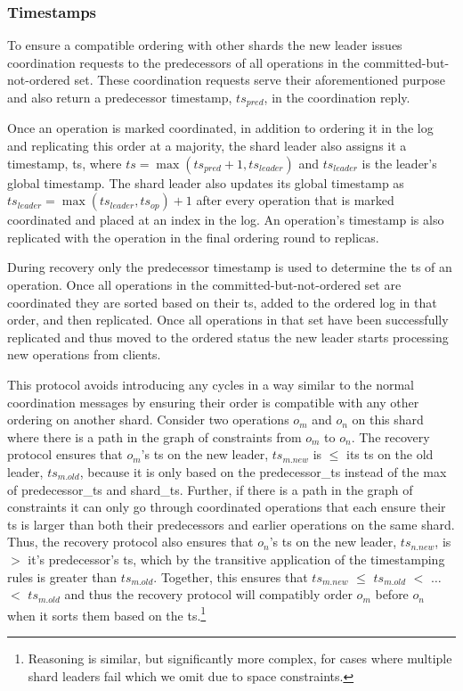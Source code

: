 \subsubsection{Timestamps}
To ensure a compatible ordering with other shards the new leader issues coordination requests to the predecessors of all operations in the committed-but-not-ordered set.
These coordination requests serve their aforementioned purpose and also return a predecessor timestamp, $ts_{pred}$, in the coordination reply. 

Once an operation is marked coordinated, in addition to ordering it in the log and replicating this order at a majority, the shard leader also assigns it a timestamp, ts, where $ts = \max(ts_{pred} + 1, ts_{leader})$ and $ts_{leader}$ is the leader's global timestamp. The shard leader also updates its global timestamp as $ts_{leader} = \max(ts_{leader}, ts_{op}) + 1$ after every operation that is marked coordinated and placed at an index in the log. An operation's timestamp is also replicated with the operation in the final ordering round to replicas.

During recovery only the predecessor timestamp is used to determine the ts of an operation.
Once all operations in the committed-but-not-ordered set are coordinated they are sorted based on their ts, added to the ordered log in that order, and then replicated.
Once all operations in that set have been successfully replicated and thus moved to the ordered status the new leader starts processing new operations from clients.

This protocol avoids introducing any cycles in a way similar to the normal coordination messages by ensuring their order is compatible with any other ordering on another shard.
Consider two operations $o_m$ and $o_n$ on this shard where there is a path in the graph of constraints from $o_m$ to $o_n$.
The recovery protocol ensures that $o_m$'s ts on the new leader, $\textit{ts}_\textit{m.new}$ is $\le$ its ts on the old leader, $\textit{ts}_\textit{m.old}$, because it is only based on the predecessor\_ts instead of the max of predecessor\_ts and shard\_ts.
Further, if there is a path in the graph of constraints it can only go through coordinated operations that each ensure their ts is larger than both their predecessors and earlier operations on the same shard.
Thus, the recovery protocol also ensures that $o_n$'s ts on the new leader, $\textit{ts}_\textit{n.new}$, is $>$ it's predecessor's ts, which by the transitive application of the timestamping rules is greater than $\textit{ts}_\textit{m.old}$.
Together, this ensures that  $\textit{ts}_\textit{m.new}$ $\le$ $\textit{ts}_\textit{m.old}$ $<$ $\ldots$ $<$ $\textit{ts}_\textit{m.old}$ and thus the recovery protocol will compatibly order $o_m$ before $o_n$ when it sorts them based on the ts.\footnote{Reasoning is similar, but significantly more complex, for cases where multiple shard leaders fail which we omit due to space constraints.}


